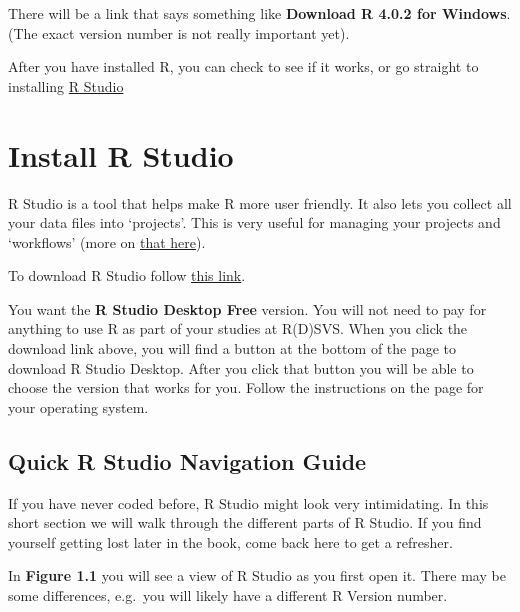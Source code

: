 \documentclass[
]{book}
\begin{document}
There will be a link that says something like \textbf{Download R 4.0.2 for Windows}. (The exact version number is not really important yet).

After you have installed R, you can check to see if it works, or go straight to installing \protect\hyperlink{install_rs}{R Studio}

\hypertarget{install_rs}{%
\section{Install R Studio}\label{install_rs}}

R Studio is a tool that helps make R more user friendly. It also lets you collect all your data files into `projects'. This is very useful for managing your projects and `workflows' (more on \protect\hyperlink{workflows}{that here}).

To download R Studio follow \href{https://rstudio.com/products/rstudio/download/?utm_source=downloadrstudio\&utm_medium=Site\&utm_campaign=home-hero-cta}{this link}.

You want the \textbf{R Studio Desktop Free} version. You will not need to pay for anything to use R as part of your studies at R(D)SVS. When you click the download link above, you will find a button at the bottom of the page to download R Studio Desktop. After you click that button you will be able to choose the version that works for you. Follow the instructions on the page for your operating system.

\hypertarget{navigate_rs}{%
\subsection{Quick R Studio Navigation Guide}\label{navigate_rs}}

If you have never coded before, R Studio might look very intimidating. In this short section we will walk through the different parts of R Studio. If you find yourself getting lost later in the book, come back here to get a refresher.

In \textbf{Figure 1.1} you will see a view of R Studio as you first open it. There may be some differences, e.g.~you will likely have a different R Version number.
\end{document}
